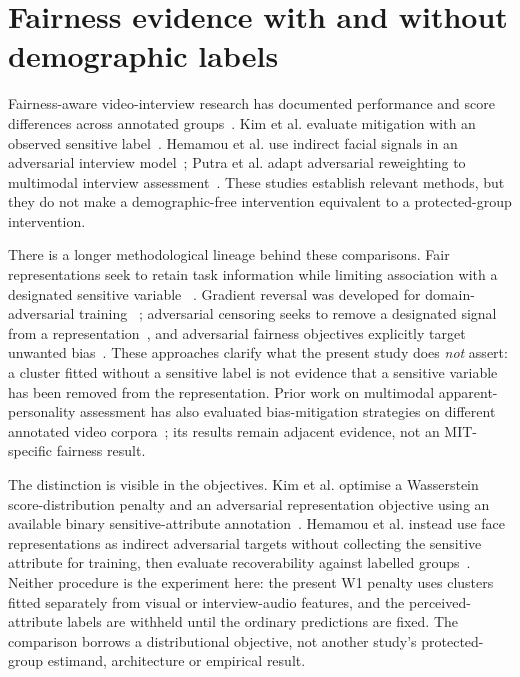 \section{Fairness evidence with and without demographic labels}

Fairness-aware video-interview research has documented performance and score differences across
annotated groups~\cite{Booth2021}. Kim et al. evaluate mitigation with an observed sensitive
label~\cite{Kim2023}. Hemamou et al. use indirect facial signals in an adversarial interview
model~\cite{HemamouIndirect2021}; Putra et al. adapt adversarial reweighting to multimodal
interview assessment~\cite{Putra2024}. These studies establish relevant methods, but they do not
make a demographic-free intervention equivalent to a protected-group intervention.

There is a longer methodological lineage behind these comparisons. Fair representations seek to
retain task information while limiting association with a designated sensitive variable
~\cite{Zemel2013}. Gradient reversal was developed for domain-adversarial training
~\cite{Ganin2015}; adversarial censoring seeks to remove a designated signal from a
representation~\cite{Edwards2016}, and adversarial fairness objectives explicitly target
unwanted bias~\cite{ZhangBL2018}. These approaches clarify what the present study does
\emph{not} assert: a cluster fitted without a sensitive label is
not evidence that a sensitive variable has been removed from the representation. Prior work on
multimodal apparent-personality assessment has also evaluated bias-mitigation strategies on
different annotated video corpora~\cite{Yan2020}; its results remain adjacent evidence, not an
MIT-specific fairness result.

The distinction is visible in the objectives. Kim et al. optimise a Wasserstein score-distribution
penalty and an adversarial representation objective using an available binary sensitive-attribute
annotation~\cite{Kim2023}. Hemamou et al. instead use face representations as indirect adversarial
targets without collecting the sensitive attribute for training, then evaluate recoverability
against labelled groups~\cite{HemamouIndirect2021}. Neither procedure is the experiment here:
the present W1 penalty uses clusters fitted separately from visual or interview-audio features,
and the perceived-attribute labels are withheld until the ordinary predictions are fixed. The
comparison borrows a distributional objective, not another study's protected-group estimand,
architecture or empirical result.

